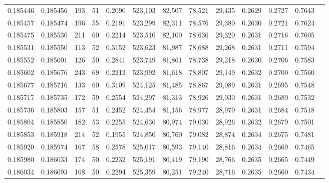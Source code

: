 \begin{tabular}{rrrrrrrrrrrrr}
0.185446 & 0.185456 &   193 &  51 &                                     0.2090 & 523,103 &  82,507 &  78,521 &  29,435 & 0.2629 & 0.2727 & 0.7643 \\
0.185457 & 0.185474 &   196 &  55 &                                     0.2191 & 523,299 &  82,311 &  78,576 &  29,380 & 0.2630 & 0.2721 & 0.7624 \\
0.185475 & 0.185530 &   211 &  60 &                                     0.2214 & 523,510 &  82,100 &  78,636 &  29,320 & 0.2631 & 0.2716 & 0.7605 \\
0.185531 & 0.185550 &   113 &  52 &                                     0.3152 & 523,623 &  81,987 &  78,688 &  29,268 & 0.2631 & 0.2711 & 0.7594 \\
0.185552 & 0.185601 &   126 &  50 &                                     0.2841 & 523,749 &  81,861 &  78,738 &  29,218 & 0.2630 & 0.2706 & 0.7583 \\
0.185602 & 0.185676 &   243 &  69 &                                     0.2212 & 523,992 &  81,618 &  78,807 &  29,149 & 0.2632 & 0.2700 & 0.7560 \\
0.185677 & 0.185716 &   133 &  60 &                                     0.3109 & 524,125 &  81,485 &  78,867 &  29,089 & 0.2631 & 0.2695 & 0.7548 \\
0.185717 & 0.185735 &   172 &  59 &                                     0.2554 & 524,297 &  81,313 &  78,926 &  29,030 & 0.2631 & 0.2689 & 0.7532 \\
0.185736 & 0.185803 &   157 &  51 &                                     0.2452 & 524,454 &  81,156 &  78,977 &  28,979 & 0.2631 & 0.2684 & 0.7518 \\
0.185804 & 0.185850 &   182 &  53 &                                     0.2255 & 524,636 &  80,974 &  79,030 &  28,926 & 0.2632 & 0.2679 & 0.7501 \\
0.185853 & 0.185918 &   214 &  52 &                                     0.1955 & 524,850 &  80,760 &  79,082 &  28,874 & 0.2634 & 0.2675 & 0.7481 \\
0.185920 & 0.185974 &   167 &  58 &                                     0.2578 & 525,017 &  80,593 &  79,140 &  28,816 & 0.2634 & 0.2669 & 0.7465 \\
0.185980 & 0.186033 &   174 &  50 &                                     0.2232 & 525,191 &  80,419 &  79,190 &  28,766 & 0.2635 & 0.2665 & 0.7449 \\
0.186034 & 0.186093 &   168 &  50 &                                     0.2294 & 525,359 &  80,251 &  79,240 &  28,716 & 0.2635 & 0.2660 & 0.7434 \\

\end{tabular}
